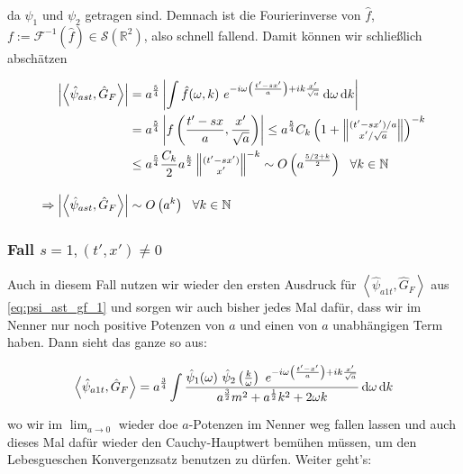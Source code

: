 \documentclass{scrartcl}
\begin{document}
da $\psi_1$ und $\psi_2$ getragen sind. Demnach ist die Fourierinverse von
$\hat f$, $f := \mathcal{F}^{-1}(\hat f) \in \mathcal{S}(\mathbb{R}^2)$, also schnell
fallend. Damit können wir schließlich abschätzen

\begin{align}
    \left| \left< \hat\psi_{ast}, \hat G_F \right> \right|
    &=
    a^\frac{5}{4} \left|  \int \hat f(\omega, k)
    ~e^{-i \omega \left(\frac{t'-sx'}{a}\right) + ik \frac{x'}{\sqrt{a}}}
    \mathop{}\!\mathrm{d} \omega \mathop{}\!\mathrm{d} k
    \right|
    \nonumber \\
    &=
    a^\frac{5}{4} \left| f \left(\frac{t'-sx}{a}, \frac{x'}{\sqrt{a}}\right) \right|
    \leq
    a^\frac{5}{4} C_k\left(
    1 + \left\lVert \substack{(t'-sx')/a \\ x'/\sqrt{a}} \right\rVert
    \right)^{-k}
    \nonumber \\
    &\leq
    a^\frac{5}{4} \frac{C_k}{2} a^{\frac{k}{2}} \left\lVert
    \substack{(t'-sx') \\ x'} \right\rVert^{-k}
    \sim O\left(a^\frac{5/2+k}{2}\right) ~~ \forall k \in \mathbb{N}
    \nonumber \\[1em]
    \Rightarrow
     \left| \left< \hat\psi_{ast}, \hat G_F \right> \right|
     &\sim
     O\left(a^k\right) ~~ \forall k \in \mathbb{N}
\end{align}


\subsubsection*{Fall $s = 1, (t', x') \neq 0$}
Auch in diesem Fall nutzen wir wieder den ersten Ausdruck für
$\left< \hat\psi_{a1t}, \hat G_F \right>$ aus \eqref{eq:psi_ast_gf_1} und sorgen
wir auch bisher jedes Mal dafür, dass wir im Nenner nur noch positive Potenzen von
$a$ und einen von $a$ unabhängigen Term haben. Dann sieht das ganze so aus:

\begin{equation*}
    \left< \hat\psi_{a1t}, \hat G_F \right>
    =
    a^\frac{3}{4} \int \frac{\hat \psi_1(\omega)
    ~\hat\psi_2 \left(\frac{k}{\omega}\right)
    ~ e^{-i \omega \left(\frac{t'-x'}{a}\right) + i k \frac{x'}{\sqrt{a}}}
    }
    {
        a^\frac{3}{2} m^2 + a^\frac{1}{2} k^2 + 2 \omega k
    }
    \mathop{}\!\mathrm{d} \omega \mathop{}\!\mathrm{d} k
\end{equation*}

wo wir im $\lim_{a \rightarrow 0}$ wieder doe $a$-Potenzen im Nenner weg fallen lassen
und auch dieses Mal dafür wieder den Cauchy-Hauptwert bemühen müssen, um den
Lebesgueschen Konvergenzsatz benutzen zu dürfen.
Weiter geht's:
\end{document}

